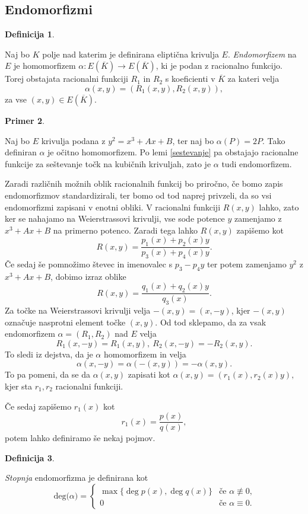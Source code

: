 \documentclass[12pt,a4paper,twoside]{article}
\theoremstyle{definition} %
\newtheorem{definicija}{Definicija}[section]
\newtheorem{primer}[definicija]{Primer}
\theoremstyle{plain} %
\numberwithin{equation}{section}  %
\newcommand{\E}[1]{E({#1})}
\newcommand{\DEG}[1]{\ \text{deg(}{#1}\text{)}}
\begin{document}
\subsection{Endomorfizmi}
\label{endomorfizmi}

\begin{definicija}~

Naj bo $K$ polje nad katerim je definirana eliptična krivulja $E$.
\emph{Endomorfizem} na $E$ je homomorfizem $\alpha: \E{\overline{K}} \rightarrow \E{\overline{K}} $, ki je podan z racionalno funkcijo. Torej obstajata racionalni funkciji $R_1$ in $R_2$ s koeficienti v $\overline{K}$ za kateri velja
$$\alpha(x,y) = (R_1(x,y),R_2(x,y)),$$
za vse $(x,y) \in \E{\overline{K}}$.
\end{definicija}

\begin{primer}~

Naj bo $E$ krivulja podana z $y^2 = x^3+Ax+B$, ter naj bo $\alpha(P) = 2P$. Tako definiran $\alpha$ je očitno homomorfizem. Po lemi \ref{sestevanje} pa obstajajo racionalne funkcije za seštevanje točk na kubičnih krivuljah, zato je $\alpha$ tudi endomorfizem.
\end{primer}

Zaradi različnih možnih oblik racionalnih funkcij bo priročno, če bomo zapis endomorfizmov standardizirali, ter bomo od tod naprej privzeli, da so vsi endomorfizmi zapisani v enotni obliki.
V racionalni funkciji $R(x,y)$ lahko, zato ker se nahajamo na Weierstrassovi krivulji, vse sode potence $y$ zamenjamo z $x^3+Ax+B$ na primerno potenco. Zaradi tega lahko $R(x,y)$ zapišemo kot
$$R(x,y) = \frac{p_1(x)+p_2(x)y}{p_3(x)+p_4(x)y}.$$
Če sedaj še pomnožimo števec in imenovalec s $p_3-p_4y$ ter potem zamenjamo $y^2$ z $x^3+Ax+B$, dobimo izraz oblike
$$R(x,y) = \frac{q_1(x)+q_2(x)y}{q_3(x)}.$$
Za točke na Weierstrassovi krivulji velja $-(x,y) = (x,-y)$, kjer $-(x,y)$ označuje nasprotni element točke $(x,y)$. Od tod sklepamo, da za vsak endomorfizem $\alpha = (R_1,R_2) $ nad $E$ velja
$$R_1(x,-y) = R_1(x,y), \ R_2(x,-y) = -R_2(x,y).$$
To sledi iz dejstva, da je $\alpha$ homomorfizem in velja
$$\alpha(x,-y) = \alpha(-(x,y)) = -\alpha(x,y).$$
To pa pomeni, da se da $\alpha(x,y)$ zapisati kot
$\alpha(x,y) = (r_1(x),r_2(x)y),$
kjer sta $r_1,r_2$ racionalni funkciji.

Če sedaj zapišemo $r_1(x)$ kot
$$r_1(x) = \frac{p(x)}{q(x)},$$
potem lahko definiramo še nekaj pojmov. 

\begin{definicija}~

\emph{Stopnja} endomorfizma je  definirana kot
$$
\DEG{\alpha} =
\begin{cases}
\max \{ \deg{p(x)},\deg{q(x)} \} & \text{če }\alpha \not\equiv 0, \\
0 & \text{če } \alpha \equiv 0.
\end{cases}
$$
\end{definicija}
\end{document}

